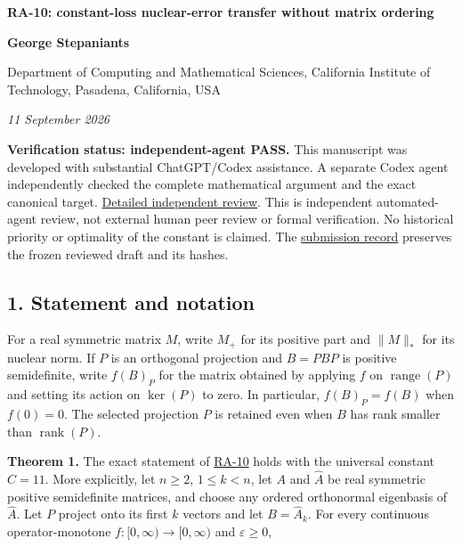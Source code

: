 \documentclass[10pt,a4paper]{article}
\begin{document}
{\raggedright\Large\bfseries RA-10: constant-loss nuclear-error transfer
without matrix ordering\par}
\vspace{0.4em}
{\normalsize\bfseries George Stepaniants\par}
{\small Department of Computing and Mathematical Sciences, California
Institute of Technology, Pasadena, California, USA\par}

\vspace{0.6em}
\pagestyle{plain}

\emph{11 September 2026}

\textbf{Verification status: independent-agent PASS.} This manuscript
was developed with substantial ChatGPT/Codex assistance. A separate
Codex agent independently checked the complete mathematical argument and
the exact canonical target.
\href{https://github.com/ajt60gaibb/OpenProblemsInNLA/blob/main/references/stepaniants-ra10-2026-09-11/verification/RA-10-independent-review.md}{Detailed
independent review}. This is independent automated-agent review, not
external human peer review or formal verification. No historical
priority or optimality of the constant is claimed. The
\href{https://github.com/ajt60gaibb/OpenProblemsInNLA/blob/main/references/stepaniants-ra10-2026-09-11/README.md}{submission
record} preserves the frozen reviewed draft and its hashes.

\subsection{1. Statement and notation}\label{statement-and-notation}

For a real symmetric matrix \(M\), write \(M_+\) for its positive part
and \(\|M\|_*\) for its nuclear norm. If \(P\) is an orthogonal
projection and \(B=PBP\) is positive semidefinite, write \(f(B)_P\) for
the matrix obtained by applying \(f\) on \(\operatorname{range}(P)\) and
setting its action on \(\ker(P)\) to zero. In particular,
\(f(B)_P=f(B)\) when \(f(0)=0\). The selected projection \(P\) is
retained even when \(B\) has rank smaller than
\(\operatorname{rank}(P)\).

\textbf{Theorem 1.} The exact statement of
\href{https://github.com/ajt60gaibb/OpenProblemsInNLA/blob/main/randomized-and-low-rank-approximation/RA-10/README.md}{RA-10}
holds with the universal constant \(C=11\). More explicitly, let
\(n\ge2\), \(1\le k<n\), let \(A\) and \(\widehat A\) be real symmetric
positive semidefinite matrices, and choose any ordered orthonormal
eigenbasis of \(\widehat A\). Let \(P\) project onto its first \(k\)
vectors and let \(B=\widehat A_k\). For every continuous
operator-monotone \(f:[0,\infty)\to[0,\infty)\) and \(\varepsilon\ge0\),
\end{document}
